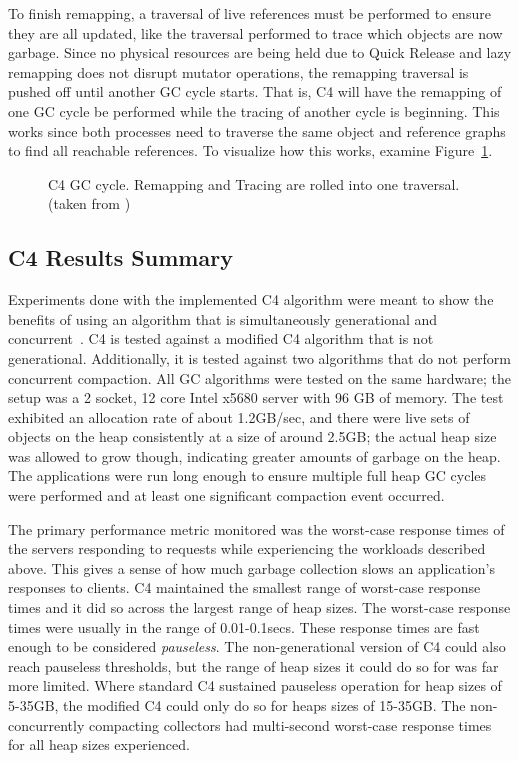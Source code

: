 \documentclass{sig-alternate}
\begin{document}
To finish remapping, a traversal of live references must be performed to
ensure they are all updated, like the traversal performed to trace which
objects are now garbage. Since no physical resources are being held due
to Quick Release and lazy remapping does not disrupt mutator operations,
the remapping traversal is pushed off until another GC cycle starts. That
is, C4 will have the remapping of one GC cycle be performed while the tracing
of another cycle is beginning. This works since both processes need to traverse
the same object and reference graphs to find all reachable references. To
visualize how this works, examine Figure~\ref{fig:c4Cycle}.


\begin{figure}
\centering
{}
\caption{C4 GC cycle. Remapping and Tracing are rolled into one traversal.
(taken from \cite{Tene:C4})}
\label{fig:c4Cycle}
\end{figure}


\subsection{C4 Results Summary}
\label{sec:c4Results}

Experiments done with the implemented C4 algorithm were meant to show the
benefits of using an algorithm that is simultaneously generational and concurrent~\cite{Tene:C4}.
C4 is tested against a modified C4 algorithm that is not generational. Additionally,
it is tested against two algorithms that do not perform concurrent compaction. 
All GC algorithms were tested on the same hardware; the setup was a
2 socket, 12 core Intel x5680 server with 96 GB of memory. The test exhibited
an allocation rate of about 1.2GB/sec, and there were live sets of objects on 
the heap consistently at a size of around 2.5GB; the actual heap size was allowed 
to grow though, indicating greater amounts of garbage on the heap. The applications were run long
enough to ensure multiple full heap GC cycles were performed and at least one
significant compaction event occurred.

The primary performance metric monitored was the worst-case response times
of the servers responding to requests while experiencing the workloads
described above. This gives a sense of how much garbage collection slows
an application's responses to clients. C4 maintained the smallest 
range of worst-case response times and it did so across the largest range of heap sizes.
The worst-case response times were usually in the range of 0.01-0.1secs. 
These response times are fast enough to be considered \emph{pauseless}. 
The non-generational version of C4 could also reach pauseless thresholds,
but the range of heap sizes it could do so for was far more limited. Where standard
C4 sustained pauseless operation for heap sizes of 5-35GB, the modified C4 could
only do so for heaps sizes of 15-35GB. The non-concurrently compacting
collectors had multi-second worst-case response times for all heap sizes experienced.
\end{document}
